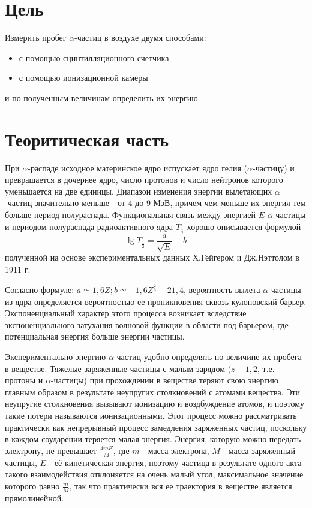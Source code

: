 \documentclass[a4paper,14pt]{extarticle}
\begin{document}
\section{Цель} %
\label{sec:цель}
Измерить пробег $\alpha$-частиц в воздухе двумя способами:
\begin{itemize}
	\item с помощью сцинтилляционного счетчика
	\item с помощью ионизационной камеры
\end{itemize}
и по полученным величинам определить их энергию.

\section{Теоритическая часть} %
\label{sec:Теоритическая_часть}
	При $\alpha$-распаде исходное материнское ядро испускает ядро гелия ($\alpha$-частицу) и превращается в дочернее ядро, число протонов и число нейтронов которого уменьшается на две единицы. Диапазон изменения энергии вылетающих $\alpha$-частиц значительно меньше - от 4 до 9 МэВ, причем чем меньше их энергия тем больше период полураспада. Функциональная связь между энергией $E$ $\alpha$-частицы и периодом полураспада радиоактивного ядра $T_{\frac{1}{2}}$ хорошо описывается формулой
$$\lg{T_{\frac{1}{2}}}=\frac{a}{\sqrt{E}}+b$$
полученной на основе экспериментальных данных Х.Гейгером и Дж.Нэттолом в 1911 г.

Согласно формуле: $a \simeq 1,6Z; b \simeq-1,6Z^{\frac{2}{3}}-21,4$, вероятность вылета $\alpha$-частицы из ядра определяется вероятностью ее проникновения сквозь кулоновский барьер. Экспоненциальный характер этого процесса возникает вследствие экспоненциального затухания волновой функции в области под барьером, где потенциальная энергия больше энергии частицы.

Экспериментально энергию $\alpha$-частиц удобно определять по величине их пробега в веществе. Тяжелые заряженные частицы с малым зарядом ($z-1, 2$, т.е. протоны и $\alpha$-частицы) при прохождении в веществе теряют свою энергию главным образом в результате неупругих столкновений с атомами вещества. Эти неупругие столкновения вызывают ионизацию и воздбуждение атомов, и поэтому такие потери называются ионизационными. Этот процесс можно рассматривать практически как непрерывный процесс замедления заряженных частиц, поскольку в каждом соударении теряется малая энергия. Энергия, которую можно передать электрону, не превышает $\frac{4mE}{M}$, где $m$ - масса электрона, $M$ - масса заряженный частицы, $E$ - её кинетическая энергия, поэтому частица в результате одного акта такого взаимодействия отклоняется на очень малый угол, максимальное значение которого равно $\frac{m}{M}$, так что практически вся ее траектория в веществе является прямолинейной.
\end{document}
